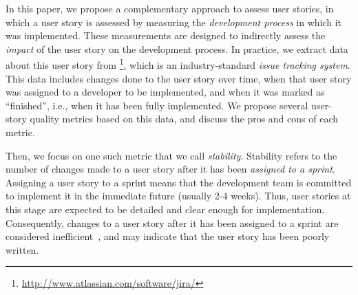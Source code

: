 






In this paper, we propose a complementary approach to assess user stories, 
in which a user story is assessed by measuring the \emph{development process} in which it was implemented. 
These measurements are designed to indirectly assess the \emph{impact} of the user story on the development process. 
In practice, we extract data about this user story from  \jira\footnote{\url{http://www.atlassian.com/software/jira/}}, which is an industry-standard \emph{issue tracking system}. 
This data includes changes done to the user story over time, when that user story was assigned to a developer to be implemented, and when it was marked as ``finished'', i.e., when it has been fully implemented. 
We propose several user-story quality metrics based on this data, and discuss the pros and cons of each metric. 


Then, we focus on one such metric that we call \emph{stability}. 
Stability refers to the number of changes made to a user story after it has been \emph{assigned to a sprint}. %
Assigning a user story to a sprint means that the development team is committed to implement it in the immediate future (usually 2-4 weeks). 
Thus, user stories at this stage are expected to be detailed and clear enough for implementation. 
Consequently, changes to a user story after it has been assigned to a sprint are considered inefficient~\cite{Requirements_engineering_change_sprint}, and may indicate that the user story has been poorly written. %


